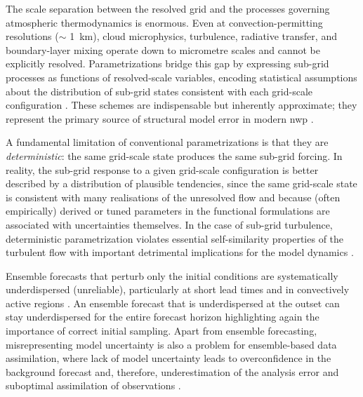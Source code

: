 The scale separation between the resolved grid and the processes governing
atmospheric thermodynamics is enormous. Even at convection-permitting
resolutions ($\sim$ 1~km), cloud microphysics, turbulence, radiative transfer,
and boundary-layer mixing operate down to micrometre scales and cannot be
explicitly resolved. Parametrizations bridge this gap by expressing
sub-grid processes as functions of resolved-scale variables,
encoding statistical assumptions about the distribution of sub-grid states
consistent with each grid-scale configuration
\parencite{stensrudParameterizationSchemesKeys2007,
    christensenParametrizationWeatherClimate2022}. These schemes are
indispensable but inherently approximate; they represent the primary
source of structural model error in modern \gls{nwp}
\parencite{bernerStochasticParameterizationNew2017}.

A fundamental limitation of conventional parametrizations is that they
are \emph{deterministic}: the same grid-scale state produces the same sub-grid
forcing. In reality, the sub-grid response to a given grid-scale
configuration is better described by a distribution of plausible
tendencies, since the same grid-scale state is consistent with many
realisations of the unresolved flow and because (often empirically) derived or
tuned parameters in the functional formulations are associated with
uncertainties themselves. In the case of sub-grid turbulence, deterministic
parametrization violates essential self-similarity properties of the turbulent
flow with important detrimental implications for the model dynamics
\parencite{palmerNonlinearDynamicalPerspective2001,
    palmerStochasticParametrizationModel2009,
    palmerStochasticWeatherClimate2019}.

Ensemble forecasts that perturb only the initial
conditions are systematically underdispersed (unreliable), particularly at
short lead times and in convectively active regions
\parencite{buizzaStochasticRepresentationModel1999}. An ensemble
forecast that is underdispersed at the outset can stay underdispersed for
the entire forecast horizon highlighting again the importance of correct
initial sampling. Apart from ensemble forecasting,
misrepresenting model uncertainty is also a problem for ensemble-based
data assimilation, where lack of model uncertainty leads to overconfidence in
the background forecast and, therefore, underestimation of the analysis error
and suboptimal assimilation of observations
\parencite{cardinaliRepresentingModelError2014}.

